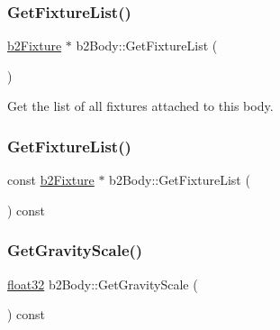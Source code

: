 \subsubsection{\texorpdfstring{GetFixtureList()}{GetFixtureList()}\hspace{0.1cm}{\footnotesize\ttfamily [1/2]}}
{\footnotesize\ttfamily \mbox{\hyperlink{classb2_fixture}{b2\+Fixture}} $\ast$ b2\+Body\+::\+Get\+Fixture\+List (\begin{DoxyParamCaption}{ }\end{DoxyParamCaption})\hspace{0.3cm}{\ttfamily [inline]}}



Get the list of all fixtures attached to this body. 

\mbox{\label{classb2_body_ae232293cb940477443434c5e846607e3}} 
\subsubsection{\texorpdfstring{GetFixtureList()}{GetFixtureList()}\hspace{0.1cm}{\footnotesize\ttfamily [2/2]}}
{\footnotesize\ttfamily const \mbox{\hyperlink{classb2_fixture}{b2\+Fixture}} $\ast$ b2\+Body\+::\+Get\+Fixture\+List (\begin{DoxyParamCaption}{ }\end{DoxyParamCaption}) const\hspace{0.3cm}{\ttfamily [inline]}}

\mbox{\label{classb2_body_aa570b2310248b4b3bd776836e839bc45}} 
\subsubsection{\texorpdfstring{GetGravityScale()}{GetGravityScale()}}
{\footnotesize\ttfamily \mbox{\hyperlink{b2_settings_8h_aacdc525d6f7bddb3ae95d5c311bd06a1}{float32}} b2\+Body\+::\+Get\+Gravity\+Scale (\begin{DoxyParamCaption}{ }\end{DoxyParamCaption}) const\hspace{0.3cm}{\ttfamily [inline]}}



